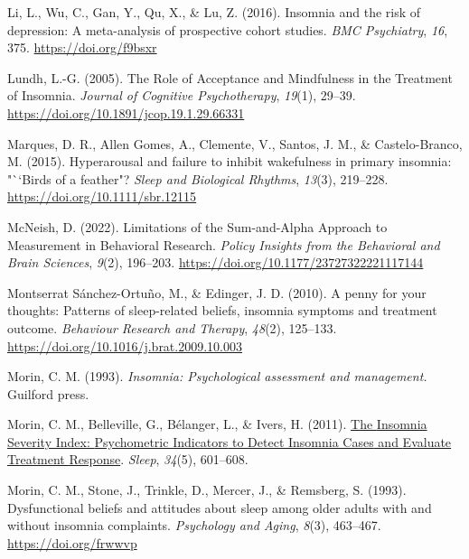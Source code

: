 \documentclass[
  ,doc,11pt, twoside,floatsintext]{apa6}
\newlength{\cslhangindent}
\newlength{\cslentryspacingunit} %
\newenvironment{CSLReferences}[2] %
 {%
  \setlength{\parindent}{0pt}
  \ifodd #1
  \let\oldpar\par
  \def\par{\hangindent=\cslhangindent\oldpar}
  \fi
  \setlength{\parskip}{#2\cslentryspacingunit}
 }%
 {}
\begin{document}
\begin{CSLReferences}{1}{0}
\leavevmode{}%
Li, L., Wu, C., Gan, Y., Qu, X., \& Lu, Z. (2016). Insomnia and the risk of depression: A meta-analysis of prospective cohort studies. \emph{BMC Psychiatry}, \emph{16}, 375. \url{https://doi.org/f9bsxr}

\leavevmode{}%
Lundh, L.-G. (2005). The {Role} of {Acceptance} and {Mindfulness} in the {Treatment} of {Insomnia}. \emph{Journal of Cognitive Psychotherapy}, \emph{19}(1), 29--39. \url{https://doi.org/10.1891/jcop.19.1.29.66331}

\leavevmode{}%
Marques, D. R., Allen Gomes, A., Clemente, V., Santos, J. M., \& Castelo-Branco, M. (2015). Hyperarousal and failure to inhibit wakefulness in primary insomnia: "``Birds of a feather"? \emph{Sleep and Biological Rhythms}, \emph{13}(3), 219--228. \url{https://doi.org/10.1111/sbr.12115}

\leavevmode{}%
McNeish, D. (2022). Limitations of the {Sum-and-Alpha Approach} to {Measurement} in {Behavioral Research}. \emph{Policy Insights from the Behavioral and Brain Sciences}, \emph{9}(2), 196--203. \url{https://doi.org/10.1177/23727322221117144}

\leavevmode{}%
Montserrat Sánchez-Ortuño, M., \& Edinger, J. D. (2010). A penny for your thoughts: {Patterns} of sleep-related beliefs, insomnia symptoms and treatment outcome. \emph{Behaviour Research and Therapy}, \emph{48}(2), 125--133. \url{https://doi.org/10.1016/j.brat.2009.10.003}

\leavevmode{}%
Morin, C. M. (1993). \emph{Insomnia: Psychological assessment and management.} Guilford press.

\leavevmode{}%
Morin, C. M., Belleville, G., Bélanger, L., \& Ivers, H. (2011). \href{https://www.ncbi.nlm.nih.gov/pmc/articles/PMC3079939}{The {Insomnia Severity Index}: {Psychometric Indicators} to {Detect Insomnia Cases} and {Evaluate Treatment Response}}. \emph{Sleep}, \emph{34}(5), 601--608.

\leavevmode{}%
Morin, C. M., Stone, J., Trinkle, D., Mercer, J., \& Remsberg, S. (1993). Dysfunctional beliefs and attitudes about sleep among older adults with and without insomnia complaints. \emph{Psychology and Aging}, \emph{8}(3), 463--467. \url{https://doi.org/frwwvp}


\end{CSLReferences}
\end{document}
